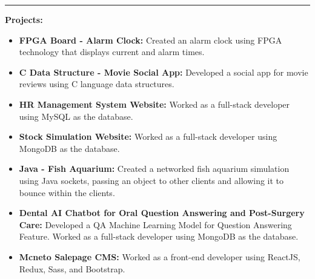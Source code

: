 \documentclass[a4paper,10pt]{article}
\begin{document}
\hrule
\vspace{0.3cm}

\noindent
\textbf{Projects:}
\begin{itemize}[leftmargin=0.5cm]
    \item \textbf{FPGA Board - Alarm Clock:} Created an alarm clock using FPGA technology that displays current and alarm times.
    \item \textbf{C Data Structure - Movie Social App:} Developed a social app for movie reviews using C language data structures.
    \item \textbf{HR Management System Website:} Worked as a full-stack developer using MySQL as the database.
    \item \textbf{Stock Simulation Website:} Worked as a full-stack developer using MongoDB as the database.
    \item \textbf{Java - Fish Aquarium:} Created a networked fish aquarium simulation using Java sockets, passing an object to other clients and allowing it to bounce within the clients.
    \item \textbf{Dental AI Chatbot for Oral Question Answering and Post-Surgery Care:} Developed a QA Machine Learning Model for Question Answering Feature. Worked as a full-stack developer using MongoDB as the database.
    \item \textbf{Mcneto Salepage CMS:} Worked as a front-end developer using ReactJS, Redux, Sass, and Bootstrap.
\end{itemize}
\end{document}
